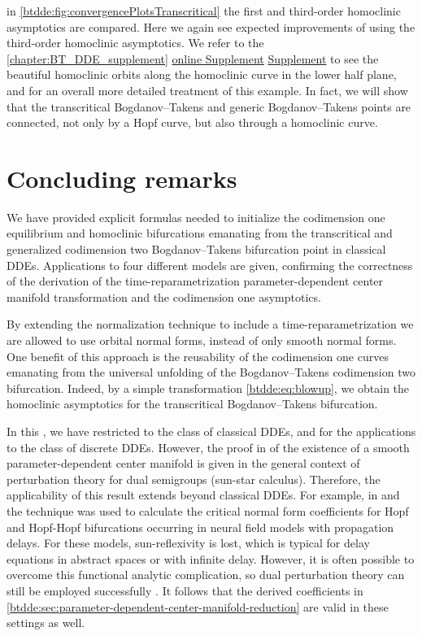 in \cref{btdde:fig:convergencePlotsTranscritical} the first and third-order
homoclinic asymptotics are compared. Here we again see expected improvements of using the
third-order homoclinic asymptotics. We refer to the
\ifthesis%
    \cref{chapter:BT_DDE_supplement} %
\fi%
\ifsiam%
    \hyperref[mysupplement]{online Supplement} %
\fi%
\ifarxiv%
    \hyperlink{mysupplement}{Supplement} %
\fi to see the beautiful
homoclinic orbits along the homoclinic curve in the lower half plane, and for
an overall more detailed treatment of this example. In fact, we will show that
the transcritical Bogdanov--Takens and generic Bogdanov--Takens points are
connected, not only by a Hopf curve, but also through a homoclinic curve. 

\section{Concluding remarks}
We have provided explicit formulas needed to initialize the codimension one
equilibrium and homoclinic bifurcations emanating from the transcritical and
generalized codimension two Bogdanov--Takens bifurcation point in classical
DDEs. Applications to four different models are given, confirming the
correctness of the derivation of the time-reparametrization
parameter-dependent
center manifold transformation and the codimension one asymptotics.

By extending the normalization technique to include a time-reparametrization we
are allowed to use orbital normal forms, instead of only smooth normal forms.
One benefit of this approach is the reusability of the codimension one curves
emanating from the universal unfolding of the Bogdanov--Takens codimension two
bifurcation. Indeed, by a simple transformation \cref{btdde:eq:blowup}, we obtain the
homoclinic asymptotics for the transcritical Bogdanov--Takens bifurcation.

In this \paper{}, we have restricted to the class of classical DDEs, and for the
applications to the class of discrete DDEs. However, the proof in
\cite{Switching2019} of the existence of a smooth parameter-dependent center
manifold is given in the general context of perturbation theory for dual
semigroups (sun-star calculus). Therefore, the applicability of this result
extends beyond classical DDEs. For example, in \cite{VanGils2013} and
\cite{Dijkstra2015} the technique was used to calculate the critical normal
form coefficients for Hopf and Hopf-Hopf bifurcations occurring in neural field
models with propagation delays. For these models, sun-reflexivity is lost, which
is typical for delay equations in abstract spaces or with infinite delay.
However, it is often possible to overcome this functional analytic
complication, so dual perturbation theory can still be employed successfully
\cite{Diekmann2008,Diekmann2012blending,VanGils2013,Janssens2019}. It follows
that the derived coefficients in
\cref{btdde:sec:parameter-dependent-center-manifold-reduction} are valid in these
settings as well.

